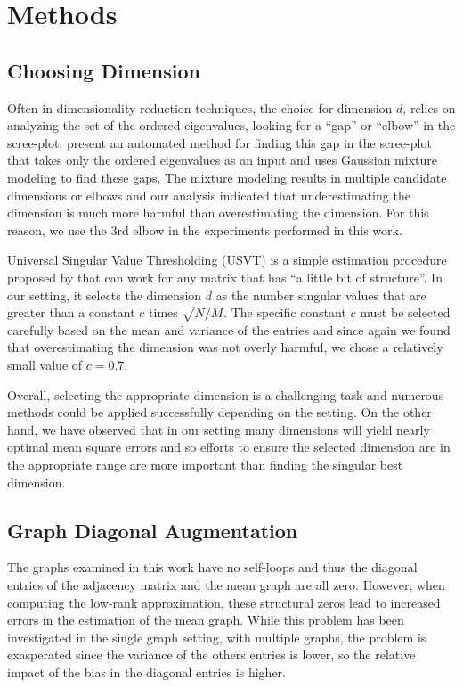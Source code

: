 \documentclass[10pt,letterpaper]{article}
\begin{document}
\section{Methods}

\subsection{Choosing Dimension}
\label{section:dim_select}
Often in dimensionality reduction techniques, the choice for dimension $d$, relies on analyzing the set of the ordered eigenvalues, looking for a ``gap'' or ``elbow'' in the scree-plot. \citet{zhu2006automatic} present an automated method for finding this gap in the scree-plot that takes only the ordered eigenvalues as an input and uses Gaussian mixture modeling to find these gaps.
The mixture modeling results in multiple candidate dimensions or elbows and our analysis indicated that underestimating the dimension is much more harmful than overestimating the dimension.
For this reason, we use the 3rd elbow in the experiments performed in this work.

Universal Singular Value Thresholding (USVT) is a simple estimation procedure proposed by \citet{chatterjee2015matrix} that can work for any matrix that has ``a little bit of structure''. 
In our setting, it selects the dimension $d$ as the number singular values that are greater than a constant $c$ times $\sqrt{N/M}$.
The specific constant $c$ must be selected carefully based on the mean and variance of the entries and since again we found that overestimating the dimension was not overly harmful, we chose a relatively small value of $c=0.7$.

Overall, selecting the appropriate dimension is a challenging task and numerous methods could be applied successfully depending on the setting.
On the other hand, we have observed that in our setting many dimensions will yield nearly optimal mean square errors and so efforts to ensure the selected dimension are in the appropriate range are more important than finding the singular best dimension.



\subsection{Graph Diagonal Augmentation}
\label{section:diag_aug}
The graphs examined in this work have no self-loops and thus the diagonal entries of the adjacency matrix and the mean graph are all zero.
However, when computing the low-rank approximation, these structural zeros lead to increased errors in the estimation of the mean graph. 
While this problem has been investigated in the single graph setting, with multiple graphs, the problem is exasperated since the variance of the others entries is lower, so the relative impact of the bias in the diagonal entries is higher.
\end{document}
